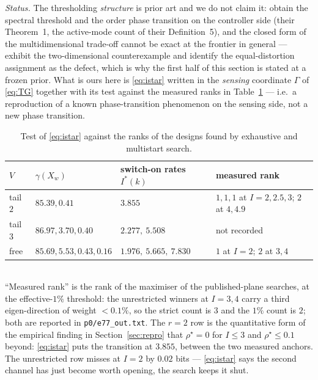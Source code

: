 \documentclass[journal]{IEEEtran}
\theoremstyle{remark}
\begin{document}
\emph{Status.} The thresholding \emph{structure} is prior art and we do not
claim it: \cite{fox2016a} obtain the spectral threshold and the order
phase transition on the controller side (their Theorem~1, the active-mode count
of their Definition~5), and the closed form of the multidimensional
trade-off cannot be exact at the frontier in general ---
\cite{stavrou2017revisited} exhibit the two-dimensional counterexample and
identify the equal-distortion assignment as the defect, which is why
the first half of this section is stated at a frozen prior. What is ours here
is \eqref{eq:istar} written in the \emph{sensing} coordinate $\Gamma$ of
\eqref{eq:TG} together with its test against the measured ranks in
Table~\ref{tab:switch} --- i.e.\ a reproduction of a known phase-transition
phenomenon on the sensing side, not a new phase transition.

\begin{table}[h]
 \centering\caption{Test of \eqref{eq:istar} against the ranks of the designs
 found by exhaustive and multistart search.}
 \label{tab:switch}
 {\scriptsize
 \begin{tabularx}{\columnwidth}{@{}lllX@{}}
 \hline
 $V$ & $\gamma(X_w)$ & switch-on rates $I^*(k)$ & measured rank \\
 \hline
 tail $2$ & $85.39,0.41$ & $3.855$ & $1,1,1$ at $I=2,2.5,3$; $2$ at $4,4.9$ \\
 tail $3$ & $86.97,3.70,0.40$ & $2.277,\ 5.508$ & not recorded \\
 free & $85.69,5.53,0.43,0.16$ & $1.976,\ 5.665,\ 7.830$ & $1$ at $I=2$; $2$ at $3,4$ \\
 \hline
 \end{tabularx}}
 \\[1pt]{\scriptsize ``Measured rank'' is the rank of the maximiser of the
 published-plane searches, at the effective-$1\%$ threshold: the unrestricted
 winners at $I=3,4$ carry a third eigen-direction of weight $<0.1\%$, so the
 strict count is $3$ and the $1\%$ count is $2$; both are reported in
 \texttt{p0/e77\_out.txt}. The $r=2$ row is the quantitative form of the
 empirical finding in Section~\ref{sec:repro} that $\rho^{\star}=0$ for $I\le3$
 and $\rho^{\star}\le0.1$ beyond: \eqref{eq:istar} puts the transition at
 $3.855$, between the two measured anchors. The unrestricted row misses at
 $I=2$ by $0.02$ bits --- \eqref{eq:istar} says the second channel has just
 become worth opening, the search keeps it shut. }
\end{table}
\end{document}
